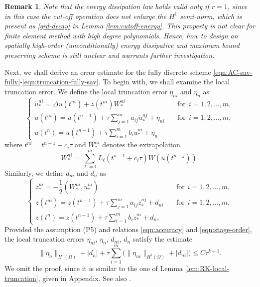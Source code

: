 \documentclass[a4paper, oneside]{book}
\def\II{(\Omega)}
\newtheorem{remark}{Remark}[section]
\begin{document}
\begin{remark}
Note that the energy dissipation law holds valid only if $r=1$,
since in this case the cut-off operation does not enlarge the $H^1$ semi-norm, which is present as \eqref{grd-decay} in Lemma \ref{lem:cutoff-energy}. This property is not clear for finite element method with high degree polynomials. Hence,
how to design an spatially high-order (unconditionally) energy dissipative and maximum bound preserving scheme
is still unclear and warrants further investigation.
\end{remark}


Next, we shall derive an error estimate for the fully discrete scheme \eqref{eqn:AC-sav-fully}-\eqref{eqn:truncation-fully-sav}.
To begin with, we shall examine the local truncation error. We define the local truncation error $\eta_{ni}$ and $\eta_{n}$  as
\begin{equation}\label{eqn:AC-sav-fully-trunc}
    \begin{cases}
    \dot u_*^{ni} = \Delta  u(t^{ni}) +  z(t^{ni}) W_*^{ni}&\quad \text{for} ~~i=1,2,\dots,m, \\ %
    u(t^{ni})=  u(t^{n-1}) + \tau \sum_{j=1}^m a_{ij} \dot u_*^{nj} + \eta_{ni}&\quad \text{for} ~~i=1,2,\dots,m, \\
    u(t^n) = u(t^{n-1}) + \tau \sum_{i=1}^m b_i \dot u_*^{ni} + \eta_{n}
  \end{cases}
\end{equation}
where $t^{ni}=t^{n-1}+c_i\tau$ and $W_*^{ni}$ denotes the extrapolation
$$ W_*^{ni} =  \sum_{\ell=1}^m L_{\ell}(t^{n-1}+c_i\tau) W(u(t^{n-j})). $$
Similarly, we define $d_{ni}$ and $d_{n}$ as
\begin{equation}\label{eqn:r-fully-trunc}
\begin{cases}
    \dot z_*^{ni} = - \dfrac12(W_*^{ni},   \dot u^{ni}_*) &\quad \text{for} ~~i=1,2,\dots,m, \\
    z(t^{ni}) = z(t^{n-1}) + \tau \sum_{j=1}^m a_{ij}  \dot z_*^{nj}+ d_{ni}&\quad \text{for} ~~i=1,2,\dots,m, \\
   z(t^{n}) = z(t^{n-1}) +  \tau \sum_{i=1}^m b_i  \dot z_*^{ni}+d_{n},
 \end{cases}
\end{equation}
Provided the assumption (P5) and relations \eqref{eqn:accuracy} and \eqref{eqn:stage-order},
the local truncation errors $\eta_{ni}$,   $\eta_{n}$,  $d_{ni}$, $d_n$ satisfy the estimate
\begin{equation}\label{eqn:trunc}
\| \eta_n \|_{H^1\II} + | d_n | + \tau \sum_{i=1}^m \Big(\| \eta_{ni} \|_{H^1\II} + |d_{ni}|\Big) \le C \tau^{k+1}.
\end{equation}
We omit the proof, since it is similar to the one of Lemma \ref{lem:RK-local-truncation}, given in Appendix.
See also \cite[Lemma 3.1]{akrivis2019energy}.
\end{document}
